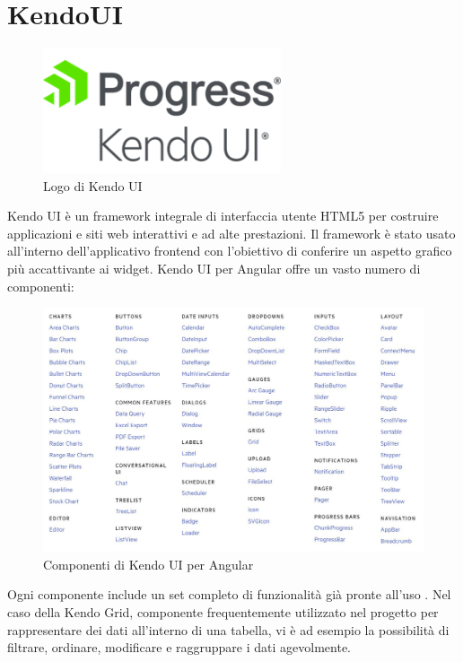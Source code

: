 \section{KendoUI}
\begin{figure}[h]
\begin{center}
  \includegraphics[width=7cm]{images/kendo_logo.png}
  \caption{Logo di Kendo UI}\label{fig:git}
\end{center}
\end{figure}
\FloatBarrier
Kendo UI è un framework integrale di interfaccia utente HTML5 per costruire applicazioni e siti web interattivi e ad alte prestazioni. \cite{KENDO}
Il framework è stato usato all'interno dell'applicativo frontend con l'obiettivo di conferire un aspetto grafico più accattivante ai widget. Kendo UI per Angular offre un vasto numero di componenti:\\
\begin{figure}[h]
\begin{center}
  \includegraphics[width=15cm]{images/kendo_components.JPG}
  \caption{Componenti di Kendo UI per Angular}\label{fig:git}
\end{center}
\end{figure}
\FloatBarrier
Ogni componente include un set completo di funzionalità già pronte all'uso \cite{KENDO}. Nel caso della Kendo Grid, componente frequentemente utilizzato nel progetto per rappresentare dei dati all'interno di una tabella, vi è ad esempio la possibilità di filtrare, ordinare, modificare e raggruppare i dati agevolmente. 
